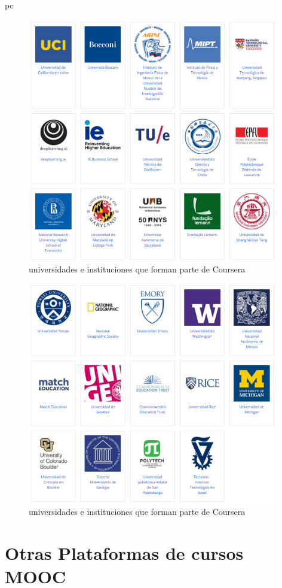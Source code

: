 pc\documentclass[a4paper,12pt,openany]{book}
\begin{document}
\begin{figure}[H]
  \centering
	\includegraphics[width=11cm]{coursera10-9.png}
\caption{universidades e instituciones que forman parte de Coursera}
  \label{fig:cour10-9}
\end{figure}

\begin{figure}[H]
  \centering
	\includegraphics[width=11cm]{coursera10-10.png}
\caption{universidades e instituciones que forman parte de Coursera}
  \label{fig:cour10-10}
\end{figure}

\section{Otras Plataformas de cursos MOOC}
\end{document}
